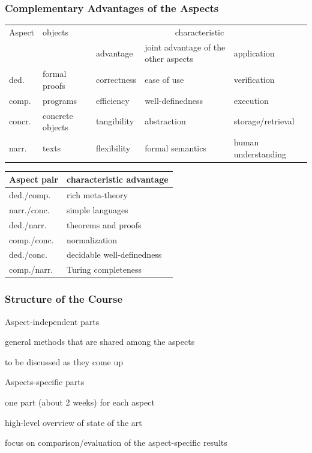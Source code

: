 \begin{frame}\frametitle{Complementary Advantages of the Aspects}
\begin{center}
\footnotesize
\begin{tabular}{|l|llp{2.1cm}l|}\hline
Aspect & objects & \multicolumn{3}{c|}{characteristic} \\
       &         & advantage & joint advantage of the other aspects & application \\\hline
ded. & formal proofs & correctness & ease of use & verification \\
comp. & programs & efficiency & well-definedness & execution\\
concr. & concrete objects & tangibility & abstraction & storage/retrieval\\
narr. & texts & flexibility & formal semantics & human understanding\\\hline
\end{tabular}
\medskip

\begin{tabular}{|l|l|}\hline
Aspect pair & characteristic advantage \\\hline
ded./comp.  & rich meta-theory \\
narr./conc. & simple languages \\\hline
ded./narr.  & theorems and proofs \\
comp./conc. & normalization \\\hline
ded./conc.  & decidable well-definedness \\
comp./narr. & Turing completeness \\\hline
\end{tabular}
\end{center}
\end{frame}

\begin{frame}\frametitle{Structure of the Course}
\begin{blockitems}{Aspect-independent parts}
\item general methods that are shared among the aspects
\item to be discussed as they come up
\end{blockitems}

\begin{blockitems}{Aspects-specific parts}
\item one part (about 2 weeks) for each aspect
\item high-level overview of state of the art
\item focus on comparison/evaluation of the aspect-specific results
\end{blockitems}
\end{frame}

